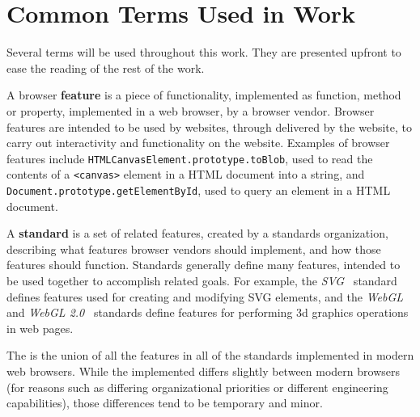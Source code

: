 \section{Common Terms Used in Work}
\label{intro:terms}

Several terms will be used throughout this work.  They are presented upfront
to ease the reading of the rest of the work.

A browser \textbf{feature} is a piece of functionality, implemented as
\JS function, method or property, implemented in a web browser, by a browser
vendor.  Browser features are intended to be used by websites, through
\JS delivered by the website, to carry out interactivity and functionality
on the website.  Examples of browser features include
\texttt{HTMLCanvasElement.prototype.toBlob}, used to read the contents of
a \texttt{<canvas>} element in a HTML document into a string, and
\texttt{Document.prototype.getElementById}, used to query an element in a
HTML document.

A \textbf{standard} is a set of related features, created by a standards
organization, describing what features browser vendors should implement, and
how those features should function.  Standards generally define many features,
intended to be used together to accomplish related goals.  For example, the
\textit{SVG}~\cite{svg2011standard} standard defines features used for creating
and modifying SVG elements, and the \textit{WebGL}~\cite{webgl2015standard} and
\textit{WebGL 2.0}~\cite{webgl22018standard} standards define features
for performing 3d graphics operations in web pages.

The \textbf{\WAPI} is the union of all the features in all of the standards
implemented in modern web browsers. While the implemented \WAPI differs slightly
between modern browsers (for reasons such as differing organizational priorities
or different engineering capabilities), those differences tend to be temporary
and minor.
